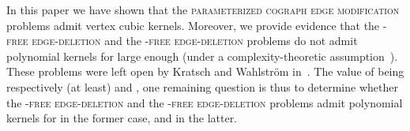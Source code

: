 \documentclass[11pt]{article}
\begin{document}
In this paper we have shown that the \textsc{parameterized cograph edge modification} problems admit vertex cubic kernels. Moreover, we provide evidence that the \textsc{-free edge-deletion} and the \textsc{-free edge-deletion} problems do not admit polynomial kernels for large enough  (under a complexity-theoretic assumption~\cite{BDFH08}). These problems were left open by Kratsch and Wahlstr\"om in~\cite{KW09}. The value of  being respectively (at least)  and , one remaining question is thus to determine whether the \textsc{-free edge-deletion} and the \textsc{-free edge-deletion} problems admit polynomial kernels for  in the former case, and  in the latter. 



\end{document}
